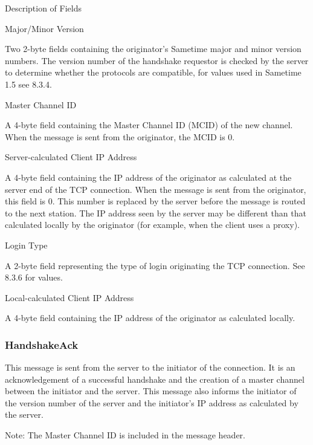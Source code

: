 \documentclass[titlepage,oneside]{book}
\begin{document}
\par{} Description of Fields

\par{} Major/Minor Version

\subpar{}  Two 2-byte fields containing the originator's Sametime major and
  minor version numbers. The version number of the handshake requestor
  is checked by the server to determine whether the protocols are
  compatible, for values used in Sametime 1.5 see 8.3.4.

\par{} Master Channel ID

\subpar{}  A 4-byte field containing the Master Channel ID (MCID) of the new
  channel. When the message is sent from the originator, the MCID is
  0.

\par{} Server-calculated Client IP Address

\subpar{}  A 4-byte field containing the IP address of the originator as
  calculated at the server end of the TCP connection. When the message
  is sent from the originator, this field is 0. This number is replaced
  by the server before the message is routed to the next station.
  The IP address seen by the server may be different than that
  calculated locally by the originator (for example, when the client
  uses a proxy).

\par{} Login Type

\subpar{}  A 2-byte field representing the type of login originating the TCP
  connection. See 8.3.6 for values.

\par{} Local-calculated Client IP Address

\subpar{}   A 4-byte field containing the IP address of the originator as
  calculated locally.

\subsubsection{HandshakeAck}

\par{} This message is sent from the server to the initiator of the
connection. It is an acknowledgement of a successful handshake and the
creation of a master channel between the initiator and the server. This
message also informs the initiator of the version number of the server
and the initiator's IP address as calculated by the server.

\par{} Note: The Master Channel ID is included in the message header.
\end{document}
